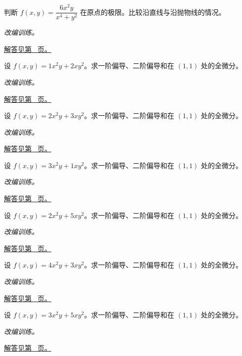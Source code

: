 \documentclass[12pt,fontset=fandol]{ctexart}
\begin{document}
\begin{example}[直线路径一致仍可能无极限]\label{ex:c32q13}
判断 $f(x,y)=\dfrac{6x^2y}{x^4+y^2}$ 在原点的极限。比较沿直线与沿抛物线的情况。
\par\textit{改编训练。}\par\hyperref[ans:c32q13]{解答见第~\pageref{ans:c32q13} 页。}
\end{example}
\begin{example}[二元多项式的偏导与全微分]\label{ex:c32q14}
设 $f(x,y)=1x^2y+2xy^2$。求一阶偏导、二阶偏导和在 $(1,1)$ 处的全微分。
\par\textit{改编训练。}\par\hyperref[ans:c32q14]{解答见第~\pageref{ans:c32q14} 页。}
\end{example}
\begin{example}[二元多项式的偏导与全微分]\label{ex:c32q15}
设 $f(x,y)=2x^2y+3xy^2$。求一阶偏导、二阶偏导和在 $(1,1)$ 处的全微分。
\par\textit{改编训练。}\par\hyperref[ans:c32q15]{解答见第~\pageref{ans:c32q15} 页。}
\end{example}
\begin{example}[二元多项式的偏导与全微分]\label{ex:c32q16}
设 $f(x,y)=3x^2y+1xy^2$。求一阶偏导、二阶偏导和在 $(1,1)$ 处的全微分。
\par\textit{改编训练。}\par\hyperref[ans:c32q16]{解答见第~\pageref{ans:c32q16} 页。}
\end{example}
\begin{example}[二元多项式的偏导与全微分]\label{ex:c32q17}
设 $f(x,y)=2x^2y+5xy^2$。求一阶偏导、二阶偏导和在 $(1,1)$ 处的全微分。
\par\textit{改编训练。}\par\hyperref[ans:c32q17]{解答见第~\pageref{ans:c32q17} 页。}
\end{example}
\begin{example}[二元多项式的偏导与全微分]\label{ex:c32q18}
设 $f(x,y)=4x^2y+3xy^2$。求一阶偏导、二阶偏导和在 $(1,1)$ 处的全微分。
\par\textit{改编训练。}\par\hyperref[ans:c32q18]{解答见第~\pageref{ans:c32q18} 页。}
\end{example}
\begin{example}[二元多项式的偏导与全微分]\label{ex:c32q19}
设 $f(x,y)=3x^2y+5xy^2$。求一阶偏导、二阶偏导和在 $(1,1)$ 处的全微分。
\par\textit{改编训练。}\par\hyperref[ans:c32q19]{解答见第~\pageref{ans:c32q19} 页。}
\end{example}
\end{document}
